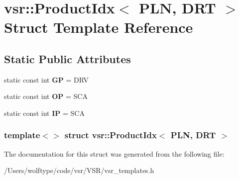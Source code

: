\hypertarget{structvsr_1_1_product_idx_3_01_p_l_n_00_01_d_r_t_01_4}{\section{vsr\-:\-:Product\-Idx$<$ P\-L\-N, D\-R\-T $>$ Struct Template Reference}
\label{structvsr_1_1_product_idx_3_01_p_l_n_00_01_d_r_t_01_4}
}
\subsection*{Static Public Attributes}
\begin{DoxyCompactItemize}
\item 
\hypertarget{structvsr_1_1_product_idx_3_01_p_l_n_00_01_d_r_t_01_4_aa5fa812b8a4e795c45c714497f8aa496}{static const int {\bfseries G\-P} = D\-R\-V}\label{structvsr_1_1_product_idx_3_01_p_l_n_00_01_d_r_t_01_4_aa5fa812b8a4e795c45c714497f8aa496}

\item 
\hypertarget{structvsr_1_1_product_idx_3_01_p_l_n_00_01_d_r_t_01_4_ac6ee088b120ec6675d18835e145582b8}{static const int {\bfseries O\-P} = S\-C\-A}\label{structvsr_1_1_product_idx_3_01_p_l_n_00_01_d_r_t_01_4_ac6ee088b120ec6675d18835e145582b8}

\item 
\hypertarget{structvsr_1_1_product_idx_3_01_p_l_n_00_01_d_r_t_01_4_a44c671213cb90e7421655b6ee8d29b0f}{static const int {\bfseries I\-P} = S\-C\-A}\label{structvsr_1_1_product_idx_3_01_p_l_n_00_01_d_r_t_01_4_a44c671213cb90e7421655b6ee8d29b0f}

\end{DoxyCompactItemize}
\subsubsection*{template$<$$>$ struct vsr\-::\-Product\-Idx$<$ P\-L\-N, D\-R\-T $>$}



The documentation for this struct was generated from the following file\-:\begin{DoxyCompactItemize}
\item 
/\-Users/wolftype/code/vsr/\-V\-S\-R/vsr\-\_\-templates.\-h\end{DoxyCompactItemize}
